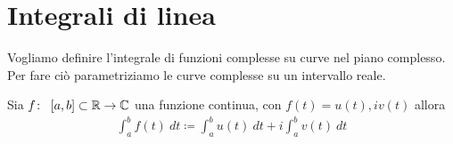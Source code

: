 \chapter{Integrali di linea}

Vogliamo definire l'integrale di funzioni complesse su curve nel piano complesso. Per fare ciò parametriziamo le curve complesse su un intervallo reale. 

\begin{definition}
	\label{defn:integrale-funzione-complessa-parametrizzata-su-intervallo-reale}
	Sia $f \colon\ \left[a,b\right]\subset \mathbb{R} \rightarrow \mathbb{C}$ una funzione continua, con $f(t) = u(t), iv(t)$ allora 
	\begin{equation*}
	\begin{aligned}
	\int_{a}^{b} f(t)\ dt \coloneqq \int_{a}^{b} u(t)\ dt + i \int_{a}^{b} v(t)\ dt 
	\end{aligned}
	\end{equation*}
\end{definition}

